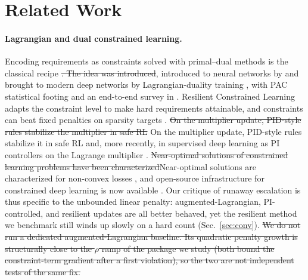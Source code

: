 \documentclass[10pt]{article}
\newcommand{\del}[1]{{\color{red}\sout{#1}}}
\begin{document}
\section{Related Work}
\label{sec:related}

\paragraph{Lagrangian and dual constrained learning.}
Encoding requirements as constraints solved with primal--dual methods is
the classical recipe \citep{bertsekas1982constrained}\del{. The idea was
introduced}{\color{blue}, introduced} to neural networks by \citet{platt1988constrained} and brought
to modern deep networks by Lagrangian-duality training
\citep{fioretto2020lagrangian}, with PAC statistical footing
\citep{chamon2020probably,chamon2022constrained} and an end-to-end survey
in \citet{kotary2021end}. Resilient Constrained Learning
\citep{hounie2023resilient} adapts the constraint level to make hard
requirements attainable, and constraints can beat fixed penalties on
sparsity targets \citep{gallego2022controlled}. \del{On the multiplier update,
PID-style rules stabilize the multiplier in safe RL}%
{\color{blue}On the multiplier update, PID-style rules stabilize it in safe RL}
\citep{stooke2020responsive} and, more recently, in supervised deep
learning as PI controllers on the Lagrange multiplier
\citep{sohrabi2024pi}. \del{Near-optimal solutions of constrained learning
problems have been characterized}{\color{blue}Near-optimal solutions are characterized} for non-convex losses
\citep{elenter2024near}, and open-source infrastructure for constrained
deep learning is now available \citep{gallego2024cooper}. Our critique of
runaway escalation is thus specific to the unbounded linear penalty:
augmented-Lagrangian, PI-controlled, and resilient updates are all better
behaved, yet the resilient method we benchmark still winds up slowly on a
hard count (Sec.~\ref{sec:conv}). \del{We do not run a dedicated
augmented-Lagrangian baseline. Its quadratic penalty growth is
structurally close to the $\rho$ ramp of the package we study (both bound
the constraint-term gradient after a first violation), so the two are not
independent tests of the same fix.}
\end{document}
